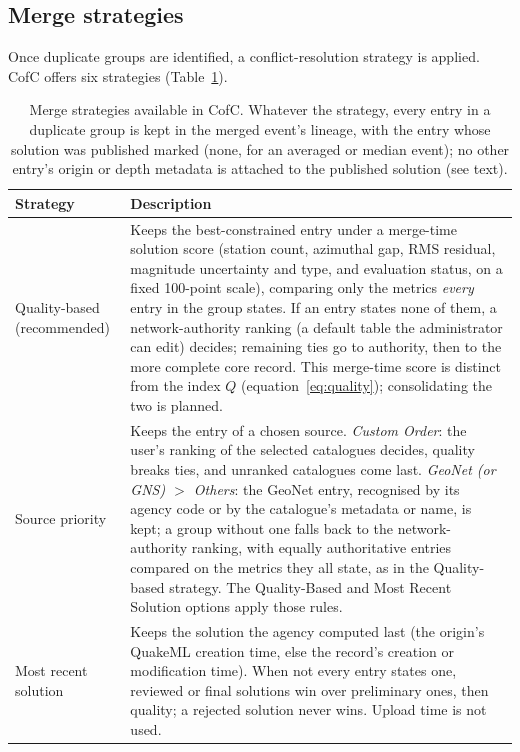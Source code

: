 \documentclass[12pt]{article}
\begin{document}
\subsection{Merge strategies}
\label{sec:strategies}

Once duplicate groups are identified, a conflict-resolution strategy is
applied.  CofC offers six strategies (Table~\ref{tab:strategies}).

\begin{table}[htbp]
\centering
\caption{Merge strategies available in CofC.  Whatever the strategy, every
entry in a duplicate group is kept in the merged event's lineage, with the
entry whose solution was published marked (none, for an averaged or median event); no
other entry's origin or depth metadata is attached to the published solution
(see text).}
\label{tab:strategies}
\small
\begin{tabular}{@{}lp{10.4cm}@{}}
\toprule
\textbf{Strategy} & \textbf{Description} \\
\midrule
Quality-based (recommended)
  & Keeps the best-constrained entry under a merge-time solution score (station
    count, azimuthal gap, RMS residual, magnitude uncertainty and type, and
    evaluation status, on a fixed 100-point scale), comparing only the metrics
    \emph{every} entry in the group states.  If an entry states none of them, a
    network-authority ranking (a default table the administrator can edit) decides; remaining ties go to authority,
    then to the more complete core record.  This merge-time score is distinct from
    the index $Q$ (equation~\eqref{eq:quality}); consolidating the two is planned. \\
Source priority
  & Keeps the entry of a chosen source.  \emph{Custom Order}: the user's
    ranking of the selected catalogues decides, quality breaks ties, and
    unranked catalogues come last.  \emph{GeoNet (or GNS) $>$ Others}: the
    GeoNet entry, recognised by its agency code or by the catalogue's metadata
    or name, is kept; a group without one falls back to the network-authority
    ranking, with equally authoritative entries compared on the metrics they all
    state, as in the Quality-based strategy.  The Quality-Based and Most Recent
    Solution options apply those rules. \\
Most recent solution
  & Keeps the solution the agency computed last (the origin's QuakeML creation
    time, else the record's creation or modification time).  When not every
    entry states one, reviewed or final solutions win over preliminary ones,
    then quality; a rejected solution never wins.  Upload time is not used. \\

\end{tabular}
\end{table}
\end{document}
